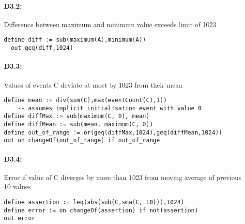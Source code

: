 \paragraph{D3.2:} Difference between maximum and minimum value exceeds limit of 1023
\begin{lstlisting}[language=tessla+salt]
  define diff := sub(maximum(A),minimum(A))
  out geq(diff,1024)
\end{lstlisting}

\paragraph{D3.3:} Values of events C deviate at most by 1023 from their mean
\begin{lstlisting}[language=tessla+salt]
define mean := div(sum(C),max(eventCount(C),1))
    -- assumes implicit initialisation event with value 0
define diffMax := sub(maximum(C, 0), mean)
define diffMean := sub(mean, maximum(C, 0))
define out_of_range := or(geq(diffMax,1024),geq(diffMean,1024))
out on changeOf(out_of_range) if out_of_range
\end{lstlisting}

\paragraph{D3.4:} Error if value of C diverges by more than 1023 from moving average of previous 10 values
\begin{lstlisting}[language=tessla+salt]
define assertion := leq(abs(sub(C,sma(C, 10))),1024)
define error := on changeOf(assertion) if not(assertion)
out error
\end{lstlisting}
